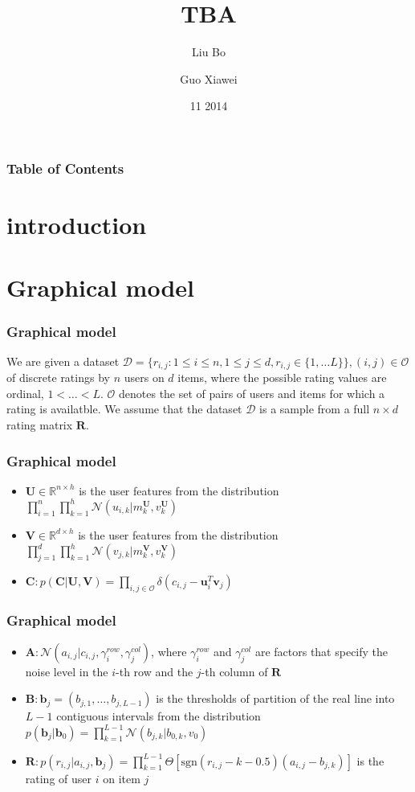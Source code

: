\documentclass{beamer}
\newcommand{\vect}[1]{\boldsymbol{\mathbf{#1}}} %
\newcommand{\vb}{\vect{b}}
\newcommand{\vB}{\vect{B}}
\newcommand{\vC}{\vect{C}}
\newcommand{\vU}{\vect{U}}
\newcommand{\vV}{\vect{V}}
\newcommand{\vu}{\vect{u}}
\newcommand{\vv}{\vect{v}}
\newcommand{\vR}{\vect{R}}
\newcommand{\vA}{\vect{A}}
\newcommand{\bR}{\mathbb{R}}
\newcommand{\mN}{\mathcal{N}}
\newcommand{\mO}{\mathcal{O}}
\begin{document}
 \title{TBA}
 \author{Liu Bo \and  Guo Xiawei}
 \date{11 2014}
\frame{\titlepage}
\begin{frame}
    \frametitle{Table of Contents}
    \tableofcontents
\end{frame}
\section{introduction}
\section{Graphical model}
\begin{frame}
    \frametitle{Graphical model}
    We are given a dataset $\mathcal{D} = \{r_{i,j}: 1\le i \le n, 1\le j\le d, r_{i,j} \in \{1,\dots L\}\},(i,j)\in \mO $ of discrete ratings by $n$ users on $d$ items, where the possible rating values are ordinal, $1<\dots<L$. $\mO$ denotes the set of pairs of users and items for which a rating is availatble. We assume that the dataset $\mathcal{D}$ is a sample from a full $n\times d$ rating matrix $\vR$.
\end{frame}
\begin{frame}
    \frametitle{Graphical model}
\begin{itemize}
    \item $\vU \in \bR^{n\times h}$  is the user features from the distribution $\prod_{i=1}^n\prod_{k=1}^h\mN(u_{i,k}|m_k^{\vU}, v_k^{\vU})$
    \item $\vV \in \bR^{d\times h}$  is the user features from the distribution $\prod_{j=1}^d\prod_{k=1}^h\mN(v_{j,k}|m_k^{\vV}, v_k^{\vV})$
    \item $\vC: p(\vC|\vU, \vV) = \prod_{i,j \in \mO}\delta(c_{i,j} - \vu_i^T \vv_j) $
\end{itemize}
\end{frame}
\begin{frame}
    \frametitle{Graphical model}
    \begin{itemize}
    \item $\vA: \mN(a_{i,j}|c_{i,j}, \gamma_i^{row}, \gamma_j^{col})$, where $\gamma_i^{row}$ and $\gamma_j^{col}$ are factors that specify the noise level in the $i$-th row and the $j$-th column of $\vR$
    \item $\vB: \vb_j = (b_{j,1},\dots ,b_{j,L-1})$ is the thresholds of partition of the real line into $L-1$ contiguous intervals from the distribution $p(\vb_j|\vb_0) = \prod^{L-1}_{k=1}\mN(b_{j,k}|b_{0,k}, v_0)$
    \item $\vR: p(r_{i,j}|a_{i,j}, \vb_j) = \prod^{L-1}_{k=1}\Theta[\text{sgn}(r_{i,j}-k-0.5)(a_{i,j} - b_{j,k})]$ is the rating of user $i$ on item $j$
\end{itemize}
\end{frame}
\end{document}
